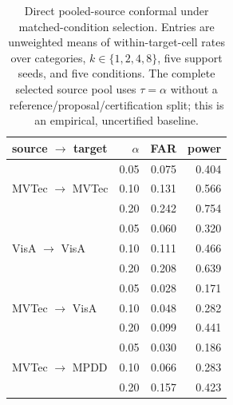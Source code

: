 \begin{table}[pos=t]
\centering
\caption{Direct pooled-source conformal under matched-condition selection. Entries are unweighted means of within-target-cell rates over categories, $k\in\{1,2,4,8\}$, five support seeds, and five conditions. The complete selected source pool uses $\tau=\alpha$ without a reference/proposal/certification split; this is an empirical, uncertified baseline.}
\label{tab:pooled-source-conformal}
\footnotesize
\setlength{\tabcolsep}{4pt}
\begin{tabular}{lrrr}
\toprule
source $\rightarrow$ target & $\alpha$ & FAR & power \\
\midrule
\multirow{3}{*}{MVTec $\rightarrow$ MVTec}
 & 0.05 & 0.075 & 0.404 \\
 & 0.10 & 0.131 & 0.566 \\
 & 0.20 & 0.242 & 0.754 \\
\cmidrule(lr){1-4}
\multirow{3}{*}{VisA $\rightarrow$ VisA}
 & 0.05 & 0.060 & 0.320 \\
 & 0.10 & 0.111 & 0.466 \\
 & 0.20 & 0.208 & 0.639 \\
\cmidrule(lr){1-4}
\multirow{3}{*}{MVTec $\rightarrow$ VisA}
 & 0.05 & 0.028 & 0.171 \\
 & 0.10 & 0.048 & 0.282 \\
 & 0.20 & 0.099 & 0.441 \\
\cmidrule(lr){1-4}
\multirow{3}{*}{MVTec $\rightarrow$ MPDD}
 & 0.05 & 0.030 & 0.186 \\
 & 0.10 & 0.066 & 0.283 \\
 & 0.20 & 0.157 & 0.423 \\
\bottomrule
\end{tabular}
\end{table}
